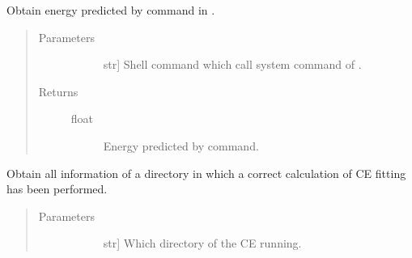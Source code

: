 \documentclass[letterpaper,10pt,english]{sphinxmanual}
\begin{document}
\begin{fulllineitems}
\begin{fulllineitems}
\begin{quote}
\begin{description}
\begin{description}
\end{description}

\end{description}\end{quote}

\end{fulllineitems}


\begin{fulllineitems}
\label{\detokenize{pygace:pygace.ce.CE.corrdump}}
\sphinxAtStartPar
Obtain energy predicted by  command in .
\begin{quote}\begin{description}
\item[{Parameters}] \leavevmode\begin{description}
\item[{}] \leavevmode{[}str{]}
\sphinxAtStartPar
Shell command which call system  command of .

\end{description}

\item[{Returns}] \leavevmode\begin{description}
\item[{float}] \leavevmode
\sphinxAtStartPar
Energy predicted by  command.

\end{description}

\end{description}\end{quote}

\end{fulllineitems}


\begin{fulllineitems}
\label{\detokenize{pygace:pygace.ce.CE.fit}}
\sphinxAtStartPar
Obtain all information of a directory in which a correct calculation of
CE fitting has been performed.
\begin{quote}\begin{description}
\item[{Parameters}] \leavevmode\begin{description}
\item[{}] \leavevmode{[}str{]}
\sphinxAtStartPar
Which directory of the CE running.


\end{description}
\end{description}
\end{quote}
\end{fulllineitems}
\end{fulllineitems}
\end{document}
